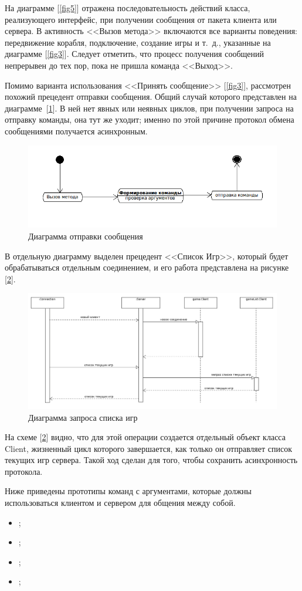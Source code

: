 На диаграмме [\ref{fig5}] отражена последовательность действий класса, реализующего интерфейс, при получении сообщения от пакета клиента или сервера. В активность <<Вызов метода>> включаются все варианты поведения: передвижение корабля, подключение, создание игры и т.~д., указанные на диаграмме  [\ref{fig3}]. Следует отметить, что процесс получения сообщений непрерывен до тех пор, пока не пришла команда <<Выход>>.

Помимо варианта использования <<Принять сообщение>> [\ref{fig3}], рассмотрен похожий прецедент отправки сообщения. Общий случай которого представлен  на диаграмме~[\ref{fig6}]. В ней нет явных или неявных циклов, при получении  запроса на отправку команды, она тут же уходит; именно по этой причине протокол обмена сообщениями получается асинхронным. 
\begin{figure}[ht]
\centering
\includegraphics[width=18cm]{images/state1.png}
\caption{Диаграмма отправки сообщения}
\label{fig6}
\end{figure}

В отдельную диаграмму выделен прецедент <<Список Игр>>, который будет обрабатываться отдельным соединением, и его работа представлена на рисунке [\ref{fig7}]. 

\begin{figure}[ht]
\centering
\includegraphics[width=16cm]{images/par2.png}
\caption{Диаграмма запроса списка игр}
\label{fig7}
\end{figure}

На схеме [\ref{fig7}] видно, что для этой операции создается отдельный объект класса Client, жизненный цикл которого завершается, как только он отправляет список текущих игр сервера. Такой ход сделан для того, чтобы сохранить асинхронность протокола.

Ниже приведены прототипы команд с аргументами, которые должны использоваться клиентом и сервером для общения между собой.
	\begin{itemize}
		\item ;
		\item ;
		\item ;
		\item ;
  	\end{itemize} 
\endinput
